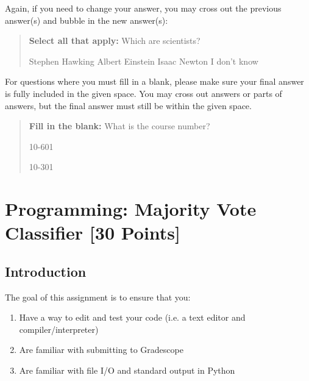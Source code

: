 \documentclass[11pt,addpoints,answers]{exam}
\begin{document}
Again, if you need to change your answer, you may cross out the previous answer(s) and bubble in the new answer(s):

\begin{quote}
\textbf{Select all that apply:} Which are scientists?
    {%
    \checkboxchar{\xcancel{$\blacksquare$}} \checkedchar{$\blacksquare$} %
    \begin{checkboxes}
    \CorrectChoice Stephen Hawking 
    \CorrectChoice Albert Einstein
    \CorrectChoice Isaac Newton
    \choice I don't know
    \end{checkboxes}
    }
\end{quote}

For questions where you must fill in a blank, please make sure your final answer is fully included in the given space. You may cross out answers or parts of answers, but the final answer must still be within the given space.

\begin{quote}
\textbf{Fill in the blank:} What is the course number?

\begin{tcolorbox}[fit,height=1cm, width=4cm, blank, borderline={1pt}{-2pt},nobeforeafter]
    \begin{center}\huge10-601\end{center}
    \end{tcolorbox}\hspace{2cm}
    \begin{tcolorbox}[fit,height=1cm, width=4cm, blank, borderline={1pt}{-2pt},nobeforeafter]
    \begin{center}\huge10-301\end{center}
    \end{tcolorbox}
\end{quote}
\clearpage

\section{Programming: Majority Vote Classifier [30 Points]} 

\subsection{Introduction}
The goal of this assignment is to ensure that you:
\begin{enumerate}
    \item Have a way to edit and test your code (i.e. a text editor and compiler/interpreter)
    \item Are familiar with submitting to Gradescope
    \item Are familiar with file I/O and standard output in Python
\end{enumerate}
\end{document}

